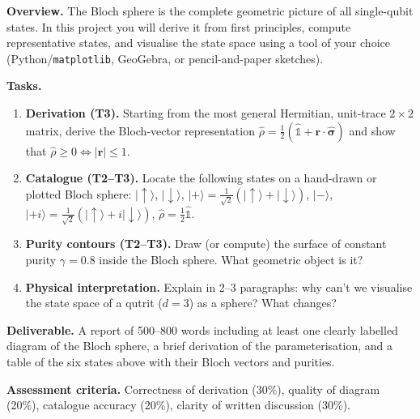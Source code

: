 \documentclass[11pt,a4paper]{article}
\begin{document}
\begin{tcolorbox}[ugprobbox, title={Project J1 --- The Bloch Sphere: A Complete Map of Qubit States}]

\textbf{Overview.}
The Bloch sphere is the complete geometric picture of all single-qubit states.
In this project you will derive it from first principles, compute representative
states, and visualise the state space using a tool of your choice
(Python/\texttt{matplotlib}, GeoGebra, or pencil-and-paper sketches).

\medskip\textbf{Tasks.}
\begin{enumerate}[leftmargin=1.8em, label=\textbf{\arabic*.}, itemsep=6pt]
  \item \textbf{Derivation (T3).}
        Starting from the most general Hermitian, unit-trace $2\times 2$ matrix,
        derive the Bloch-vector representation
        $\hat{\rho}=\tfrac{1}{2}(\hat{\mathbb{1}}+\mathbf{r}\cdot\hat{\boldsymbol{\sigma}})$
        and show that $\hat{\rho}\ge 0 \Leftrightarrow |\mathbf{r}|\le 1$.
  \item \textbf{Catalogue (T2--T3).}
        Locate the following states on a hand-drawn or plotted Bloch sphere:
        $|\uparrow\rangle$, $|\downarrow\rangle$,
        $|{+}\rangle=\tfrac{1}{\sqrt{2}}(|\uparrow\rangle+|\downarrow\rangle)$,
        $|{-}\rangle$, $|{+}i\rangle=\tfrac{1}{\sqrt{2}}(|\uparrow\rangle+i|\downarrow\rangle)$,
        $\hat{\rho}=\tfrac{1}{2}\hat{\mathbb{1}}$.
  \item \textbf{Purity contours (T2--T3).}
        Draw (or compute) the surface of constant purity $\gamma=0.8$ inside
        the Bloch sphere. What geometric object is it?
  \item \textbf{Physical interpretation.}
        Explain in 2--3 paragraphs: why can't we visualise the state space of a
        qutrit ($d=3$) as a sphere? What changes?
\end{enumerate}

\medskip\textbf{Deliverable.}
A report of 500--800 words including at least one clearly labelled diagram
of the Bloch sphere, a brief derivation of the parameterisation, and a
table of the six states above with their Bloch vectors and purities.

\medskip\textbf{Assessment criteria.}
Correctness of derivation (30\%), quality of diagram (20\%),
catalogue accuracy (20\%), clarity of written discussion (30\%).
\end{tcolorbox}

\bigskip
\end{document}
